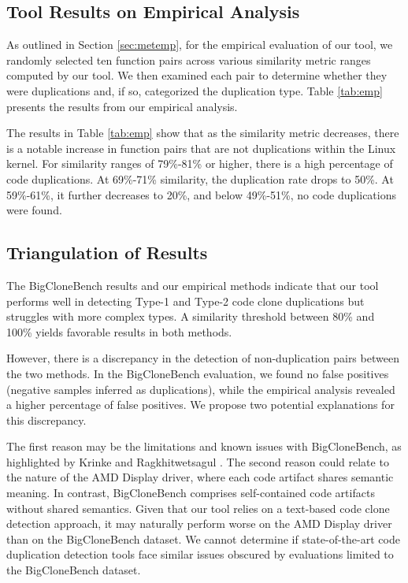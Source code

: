\subsection{Tool Results on Empirical Analysis}

As outlined in Section \ref{sec:metemp}, for the empirical evaluation of our tool, we randomly selected ten function pairs across various similarity metric ranges computed by our tool. We then examined each pair to determine whether they were duplications and, if so, categorized the duplication type. Table \ref{tab:emp} presents the results from our empirical analysis.



The results in Table \ref{tab:emp} show that as the similarity metric decreases, 
there is a notable increase in function pairs that are not duplications within 
the Linux kernel. For similarity ranges of 79\%-81\% or higher, there is a high 
percentage of code duplications. At 69\%-71\% similarity, the duplication rate 
drops to 50\%. At 59\%-61\%, it further decreases to 20\%, and below 49\%-51\%, 
no code duplications were found.

\subsection{Triangulation of Results}

The BigCloneBench results and our empirical methods indicate that our tool performs well in detecting Type-1 and Type-2 code clone duplications but struggles with more complex types. A similarity threshold between 80\% and 100\% yields favorable results in both methods.

However, there is a discrepancy in the detection of non-duplication pairs between the two methods. In the BigCloneBench evaluation, we found no false positives (negative samples inferred as duplications), while the empirical analysis revealed a higher percentage of false positives. We propose two potential explanations for this discrepancy.

The first reason may be the limitations and known issues with BigCloneBench, as highlighted by Krinke and Ragkhitwetsagul \citep{bigfail}. The second reason could relate to the nature of the AMD Display driver, where each code artifact shares semantic meaning. In contrast, BigCloneBench comprises self-contained code artifacts without shared semantics. Given that our tool relies on a text-based code clone detection approach, it may naturally perform worse on the AMD Display driver than on the BigCloneBench dataset. We cannot determine if state-of-the-art code duplication detection tools face similar issues obscured by evaluations limited to the BigCloneBench dataset.
